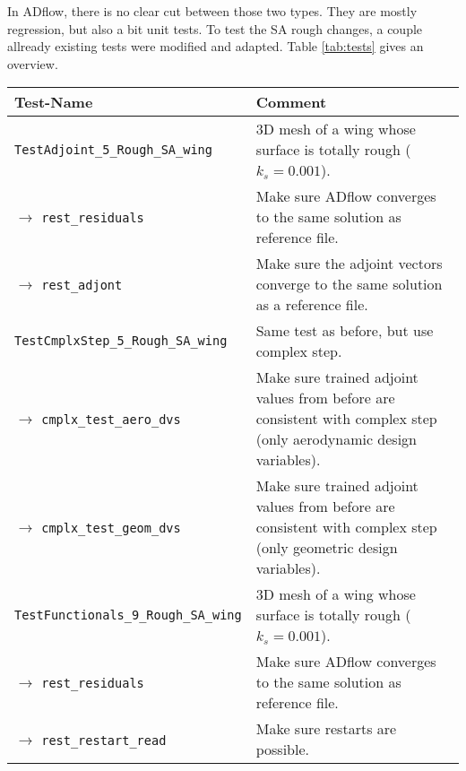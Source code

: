 In ADflow, there is no clear cut between those two types. They are mostly
regression, but also a bit unit tests. To test the SA rough changes, a couple
allready existing tests were modified and adapted. Table \ref{tab:tests} gives
an overview.

\begin{table}[H]
  \centering
  \begingroup
  \renewcommand{\arraystretch}{1.5} %
  \begin{tabularx}{\textwidth}{lX}
    Test-Name                                     & Comment \\
    \toprule
    \texttt{TestAdjoint\_5\_Rough\_SA\_wing}      & 3D mesh of a wing whose
    surface is totally rough ($k_{s} = 0.001$).\\

    $\rightarrow$ \texttt{rest\_residuals}        & Make sure ADflow converges to
    the same solution as reference file.\\

    $\rightarrow$ \texttt{rest\_adjont} & Make sure the adjoint vectors converge
    to the same solution as a reference file.\\

    \midrule

    \texttt{TestCmplxStep\_5\_Rough\_SA\_wing}    & Same test as before, but use
    complex step. \\

    $\rightarrow$ \texttt{cmplx\_test\_aero\_dvs} & Make sure trained adjoint
    values from before are consistent with complex step (only aerodynamic design
    variables).\\

    $\rightarrow$ \texttt{cmplx\_test\_geom\_dvs}& Make sure trained adjoint
    values from before are consistent with complex step (only geometric design
    variables).\\

    \midrule

    \texttt{TestFunctionals\_9\_Rough\_SA\_wing} & 3D mesh of a wing whose
    surface is totally rough ($k_{s} = 0.001$).\\

    $\rightarrow$ \texttt{rest\_residuals}        & Make sure ADflow converges to
    the same solution as reference file.\\

    $\rightarrow$ \texttt{rest\_restart\_read}    & Make sure restarts are possible.\\


\end{tabularx}
\end{table}
